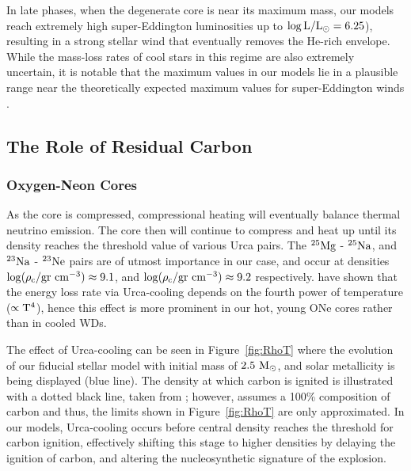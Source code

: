 \documentclass[../../main/thesis_msc.tex]{subfiles}
\begin{document}
In late phases, when the degenerate core is near its maximum mass, our models reach extremely high super-Eddington luminosities up to $\rm \log{L/L_\odot = 6.25}$), resulting in a strong stellar wind that eventually removes the He-rich envelope. While the mass-loss rates of cool stars in this regime are also extremely uncertain, it is notable that the maximum values in our models lie in a plausible range near the theoretically expected maximum values for super-Eddington winds \citep[][]{Owocki:2004zz,Smith2006}.
        
 



    \subsection{The Role of Residual Carbon} \label{sec:residualCarbon}
    
        \subsubsection{Oxygen-Neon Cores}
        
        As the core is compressed, compressional heating will eventually balance thermal neutrino emission. The core then will continue to compress and heat up until its density reaches the threshold value of various Urca pairs. The $\rm ^{25}Mg$ - $\rm ^{25}Na$, and $\rm ^{23}Na$ - $\rm ^{23}Ne$ pairs are of utmost importance in our case, and occur at densities $\rm \log(\rho_c / \rm gr \ cm^{-3}) \approx 9.1$, and $\rm \log(\rho_c / \rm gr \ cm^{-3}) \approx 9.2$ respectively. \cite{Tsuruta1970} have shown that the energy loss rate via Urca-cooling depends on the fourth power of temperature ($\rm \propto T^4$), hence this effect is more prominent in our hot, young ONe cores rather than in cooled WDs.
        
        The effect of Urca-cooling can be seen in Figure\, \ref{fig:RhoT} where the evolution of our fiducial stellar model with initial mass of $2.5 \rm \  M_{\odot}$, and solar metallicity is being displayed (blue line). The density at which carbon is ignited is illustrated with a dotted black line, taken from \mesa; however, \mesa assumes a 100\% composition of carbon and thus, the limits shown in Figure\, \ref{fig:RhoT} are only approximated. In our models, Urca-cooling occurs before central density reaches the threshold for carbon ignition, effectively shifting this stage to higher densities by delaying the ignition of carbon, and altering the nucleosynthetic signature of the explosion. 
        
\end{document}

